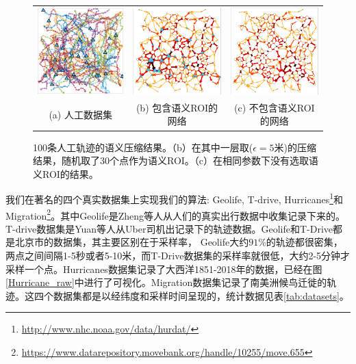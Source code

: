 \tabcolsep=0pt
\begin{figure}[!t]
\centering
\begin{tabular}{ccc}
\includegraphics[width=50mm]{pics/synthetic_raw.pdf}&
\includegraphics[width=50mm]{pics/syn_with_visualization.pdf}&
\includegraphics[width=50mm]{pics/syn_without_visulization.pdf}\\
(a) 人工数据集 & (b) 包含语义ROI的网络 & (c) 不包含语义ROI的网络  \\
\end{tabular}
\caption{100条人工轨迹的语义压缩结果。（b）在其中一层取($\epsilon=5$米)的压缩结果，随机取了30个点作为语义ROI。（c）在相同参数下没有选取语义ROI的结果。}
\label{fig:syntheticData} 
\end{figure}

我们在著名的四个真实数据集上实现我们的算法: Geolife, T-drive, Hurricanes\footnote{\url{http://www.nhc.noaa.gov/data/hurdat/}}和Migration\footnote{\url{https://www.datarepository.movebank.org/handle/10255/move.655}}。其中Geolife是Zheng等人从人们的真实出行数据中收集记录下来的。T-drive数据集是Yuan等人从Uber司机出记录下的轨迹数据。Geolife和T-Drive都是北京市的数据集，其主要区别在于采样率， Geolife大约$91\%$的轨迹都很密集，两点之间间隔1-5秒或者5-10米，而T-Drive数据集的采样率就很低，大约2-5分钟才采样一个点。Hurricanes数据集记录了大西洋1851-2018年的数据，已经在图\ref{Hurricane_raw}中进行了可视化。Migration数据集记录了南美洲候鸟迁徙的轨迹。这四个数据集都是以经纬度和采样时间呈现的，统计数据见表\ref{tab:datasets}。



